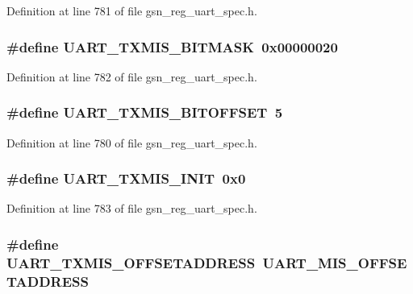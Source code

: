 Definition at line 781 of file gsn\_\-reg\_\-uart\_\-spec.h.

\hypertarget{a00575_a395b51d34c23f26f98a43fbe898969d7}{
\subsubsection[{UART\_\-TXMIS\_\-BITMASK}]{\setlength{\rightskip}{0pt plus 5cm}\#define UART\_\-TXMIS\_\-BITMASK~0x00000020}}
\label{a00575_a395b51d34c23f26f98a43fbe898969d7}


Definition at line 782 of file gsn\_\-reg\_\-uart\_\-spec.h.

\hypertarget{a00575_a193f598b79dd2e4487f129896d8b2dcf}{
\subsubsection[{UART\_\-TXMIS\_\-BITOFFSET}]{\setlength{\rightskip}{0pt plus 5cm}\#define UART\_\-TXMIS\_\-BITOFFSET~5}}
\label{a00575_a193f598b79dd2e4487f129896d8b2dcf}


Definition at line 780 of file gsn\_\-reg\_\-uart\_\-spec.h.

\hypertarget{a00575_ad8cf69d908852cfd4cc1bda9f052b866}{
\subsubsection[{UART\_\-TXMIS\_\-INIT}]{\setlength{\rightskip}{0pt plus 5cm}\#define UART\_\-TXMIS\_\-INIT~0x0}}
\label{a00575_ad8cf69d908852cfd4cc1bda9f052b866}


Definition at line 783 of file gsn\_\-reg\_\-uart\_\-spec.h.

\hypertarget{a00575_a522053fde58be7f8929a5f5ef923dbfc}{
\subsubsection[{UART\_\-TXMIS\_\-OFFSETADDRESS}]{\setlength{\rightskip}{0pt plus 5cm}\#define UART\_\-TXMIS\_\-OFFSETADDRESS~UART\_\-MIS\_\-OFFSETADDRESS}}
\label{a00575_a522053fde58be7f8929a5f5ef923dbfc}


